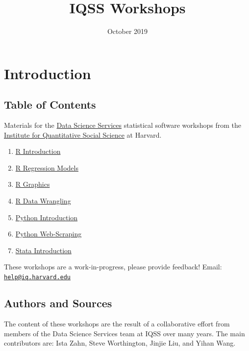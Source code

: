\documentclass[]{book}
\title{IQSS Workshops}
\author{}
\date{October 2019}
\providecommand{\tightlist}{%
  \setlength{\itemsep}{0pt}\setlength{\parskip}{0pt}}
\begin{document}
\maketitle

{
\setcounter{tocdepth}{1}
\tableofcontents
}
\chapter*{Introduction}\label{introduction}

\section*{Table of Contents}\label{table-of-contents}

Materials for the \href{http://dss.iq.harvard.edu}{Data Science
Services} statistical software workshops from the
\href{http://iq.harvard.edu}{Institute for Quantitative Social Science}
at Harvard.

\begin{enumerate}
\def\labelenumi{\arabic{enumi}.}
\tightlist
\item
  \href{./Rintro.html}{R Introduction}
\item
  \href{./Rmodels.html}{R Regression Models}
\item
  \href{./Rgraphics.html}{R Graphics}
\item
  \href{./RDataWrangling.html}{R Data Wrangling}
\item
  \href{./PythonIntro.html}{Python Introduction}
\item
  \href{./PythonWebScrape.html}{Python Web-Scraping}
\item
  \href{./StataIntro.html}{Stata Introduction}
\end{enumerate}

These workshops are a work-in-progress, please provide feedback! Email:
\href{mailto:help@iq.harvard.edu}{\nolinkurl{help@iq.harvard.edu}}

\section*{Authors and Sources}\label{authors-and-sources}

The content of these workshops are the result of a collaborative effort
from members of the Data Science Services team at IQSS over many years.
The main contributors are: Ista Zahn, Steve Worthington, Jinjie Liu, and
Yihan Wang.
\end{document}
